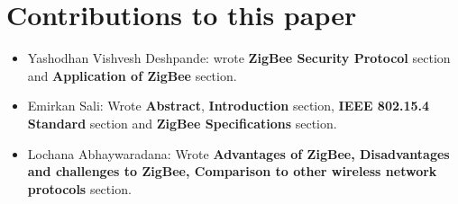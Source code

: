 \documentclass[conference]{IEEEtran}
\begin{document}
\section{Contributions to this paper}
\begin{itemize}
    \item Yashodhan Vishvesh Deshpande:  wrote \textbf{ZigBee Security Protocol} section and \textbf{ Application of ZigBee} section.\\
    \item Emirkan Sali: Wrote \textbf{Abstract}, \textbf{Introduction} section, \textbf{IEEE 802.15.4 Standard} section and \textbf{ZigBee Specifications} section.\\
    \item Lochana Abhaywaradana: Wrote \textbf{Advantages of ZigBee, Disadvantages and challenges to ZigBee, Comparison to other wireless network protocols} section. \\
\end{itemize}
 






\end{document}
